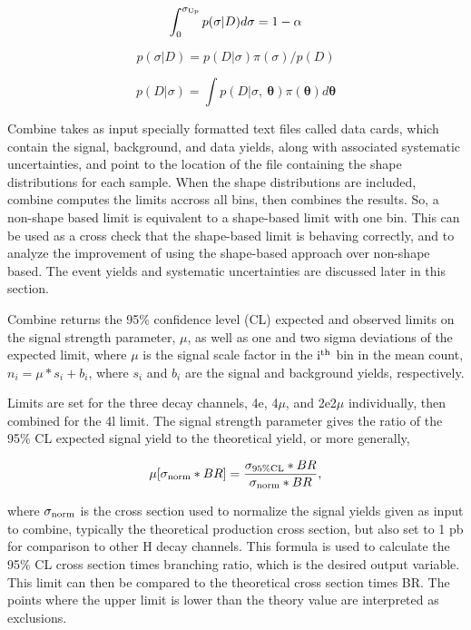 \begin{equation}\label{eq:pCL}
\int_0^{\sigma_{\rm{Up}}} p(\sigma|D)d\sigma = 1 - \alpha
\end{equation}

\begin{equation}\label{eq:pbayes}
p(\sigma|D) = p(D|\sigma)\pi(\sigma) / p(D)
\end{equation}

\begin{equation}\label{eq:pmarg}
p(D|\sigma) = \int p(D|\sigma,\ \bm{\theta}) \pi(\bm{\theta}) d\bm{\theta}
\end{equation}

Combine takes as input specially formatted text files called data cards, which contain the signal, background, and data yields, along with associated systematic uncertainties, and point to the location of the file containing the shape distributions for each sample. When the shape distributions are included, combine computes the limits accross all bins, then combines the results. So, a non-shape based limit is equivalent to a shape-based limit with one bin. This can be used as a cross check that the shape-based limit is behaving correctly, and to analyze the improvement of using the shape-based approach over non-shape based. The event yields and systematic uncertainties are discussed later in this section.

Combine returns the 95\% confidence level (CL) expected and observed limits on the signal strength parameter, $\mu$, as well as one and two sigma deviations of the expected limit, where $\mu$ is the signal scale factor in the $\rm{i}^{\rm{th}}$ bin in the mean count, $n_i = \mu * s_i + b_i$, where $s_i$ and $b_i$ are the signal and background yields, respectively.

Limits are set for the three decay channels, 4e, 4$\mu$, and 2e2$\mu$ individually, then combined for the 4l limit. The signal strength parameter gives the ratio of the 95\% CL expected signal yield to the theoretical yield, or more generally,

\begin{equation}\label{eq:mu}
\mu[\sigma_{\rm{norm}}*BR] = \frac{\sigma_{95\% \rm{CL}}*BR}{\sigma_{\rm{norm}}*BR},
\end{equation}

where $\sigma_{\rm{norm}}$ is the cross section used to normalize the signal yields given as input to combine, typically the theoretical production cross section, but also set to 1 pb for comparison to other H decay channels. This formula is used to calculate the 95\% CL cross section times branching ratio, which is the desired output variable. This limit can then be compared to the theoretical cross section times BR. The points where the upper limit is lower than the theory value are interpreted as exclusions.


